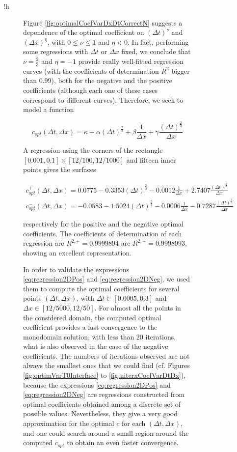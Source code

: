 \begin{figure}{!h}
\begin{subfigure}[t]{.5\linewidth}
\indent Figure \ref{fig:optimalCoefVarDxDtCorrectN} suggests a dependence of the optimal coefficient on $(\Delta t)^\nu$ and $(\Delta x)^\eta$, with $0 \leq \nu \leq 1$ and $\eta < 0$. In fact, performing some regressions with $\Delta t $ or $\Delta x$ fixed, we conclude that $\nu = \frac{2}{3}$ and $\eta = -1$ provide really well-fitted regression curves (with the coefficients of determination $R^2$ bigger than 0.99), both for the negative and the positive coefficients (although each one of these cases correspond to different curves). Therefore, we seek to model a function

\begin{equation*}
	c_{opt}(\Delta t, \Delta x) = \kappa + \alpha (\Delta t)^{\frac{2}{3}} + \beta \frac{1}{\Delta x} + \gamma   \frac{(\Delta t)^{\frac{2}{3}}}{\Delta x}
\end{equation*}

\indent A regression using the corners of the rectangle $[0.001,0.1]\times[12/100,12/1000]$ and fifteen inner points gives the surfaces

\begin{gather}
	c_{opt}^+(\Delta t, \Delta x) = 0.0775 -0.3353 (\Delta t)^{\frac{2}{3}} - 0.0012 \frac{1}{\Delta x} + 2.7407   \frac{(\Delta t)^{\frac{2}{3}}}{\Delta x} 	\label{eq:regression2DPos} \\
	c_{opt}^-(\Delta t, \Delta x) = -0.0583 -1.5024 (\Delta t)^{\frac{2}{3}} - 0.0006 \frac{1}{\Delta x} -0.7287  \frac{(\Delta t)^{\frac{2}{3}}}{\Delta x} 	\label{eq:regression2DNeg}
\end{gather}

\noindent respectively for the positive and the negative optimal coefficients. The coefficients of determination of each regression are $R^{2,+} = 0.9999894$ are $R^{2,-} = 0.9998993$, showing an excellent representation.

\indent In order to validate the expressions \eqref{eq:regression2DPos} and \eqref{eq:regression2DNeg}, we used them to compute the optimal coefficients for several points $(\Delta t, \Delta x)$, with $\Delta t \in [0.0005,0.3]$ and $\Delta x \in \left[ 12/5000,12/50\right]$. For almost all the points in the considered domain, the computed optimal coefficient provides a fast convergence to the monodomain solution, with less than 20 iterations, what is also observed in the case of the negative coefficients. The numbers of iterations observed are not always the smallest ones that we could find (cf. Figures \ref{fig:optimVarT0Interface} to \ref{fig:niterxCoefVarDtDx}), because the expressions \eqref{eq:regression2DPos} and \eqref{eq:regression2DNeg} are regressions constructed from optimal coefficients obtained among a discrete set of possible values. Nevertheless, they give a very good approximation for the optimal $c$ for each $(\Delta t, \Delta x)$, and one could search around a small region around the computed $c_{opt}$ to obtain an even faster convergence.


\end{subfigure}
\end{figure}
